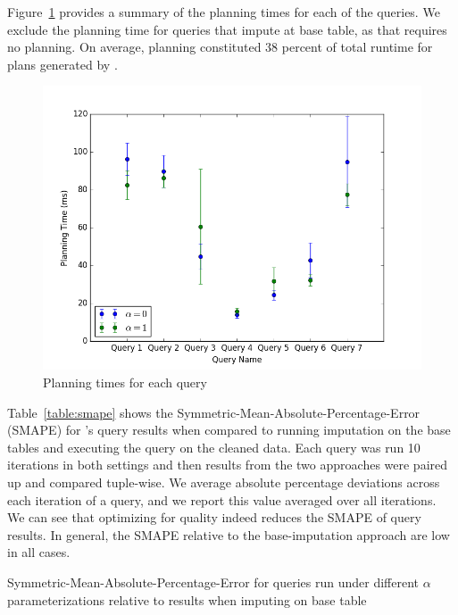 Figure~\ref{fig:plantimes} provides a summary of the planning times for each of the queries.  We exclude the planning time for queries that impute at base table, as that
requires no planning. On average, planning constituted 38 percent of total runtime for plans generated by \ProjectName{}.

\begin{figure}
\includegraphics[width=\columnwidth]{figures/planning_times_imputedb.png}
\caption{Planning times for each query}
\label{fig:plantimes}
\end{figure}

Table~\ref{table:smape} shows the Symmetric-Mean-Absolute-Percentage-Error (SMAPE) for \ProjectName{}'s query results when compared to 
running imputation on the base tables and executing the query on the
cleaned data. Each query was run 10 iterations in both settings and then results from the two approaches were paired up and compared tuple-wise. We average 
absolute percentage deviations across each iteration of a query, and we report this value averaged over all iterations.
We can see that optimizing for quality indeed reduces the SMAPE of query results. In general, the SMAPE relative to the
base-imputation approach are low in all cases.

\begin{table}
\centering

\caption{Symmetric-Mean-Absolute-Percentage-Error for queries run under different $\alpha$ parameterizations relative to results when imputing on base table}
\label{table:smape}
\end{table}


